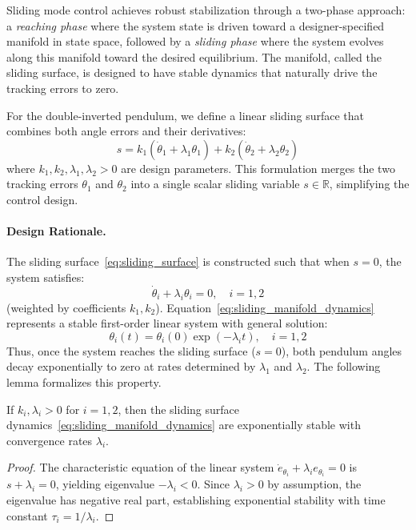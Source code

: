Sliding mode control achieves robust stabilization through a two-phase approach: a \textit{reaching phase} where the system state is driven toward a designer-specified manifold in state space, followed by a \textit{sliding phase} where the system evolves along this manifold toward the desired equilibrium. The manifold, called the sliding surface, is designed to have stable dynamics that naturally drive the tracking errors to zero.

For the double-inverted pendulum, we define a linear sliding surface that combines both angle errors and their derivatives:
\begin{equation}
\label{eq:sliding_surface}
s = k_1(\dot{\theta}_1 + \lambda_1\theta_1) + k_2(\dot{\theta}_2 + \lambda_2\theta_2)
\end{equation}
where $k_1, k_2, \lambda_1, \lambda_2 > 0$ are design parameters. This formulation merges the two tracking errors $\theta_1$ and $\theta_2$ into a single scalar sliding variable $s \in \mathbb{R}$, simplifying the control design.

\paragraph{Design Rationale.}
The sliding surface~\eqref{eq:sliding_surface} is constructed such that when $s = 0$, the system satisfies:
\begin{equation}
\label{eq:sliding_manifold_dynamics}
\dot{\theta}_i + \lambda_i\theta_i = 0, \quad i = 1, 2
\end{equation}
(weighted by coefficients $k_1, k_2$). Equation~\eqref{eq:sliding_manifold_dynamics} represents a stable first-order linear system with general solution:
\begin{equation}
\label{eq:sliding_manifold_solution}
\theta_i(t) = \theta_i(0) \exp(-\lambda_i t), \quad i = 1, 2
\end{equation}
Thus, once the system reaches the sliding surface ($s = 0$), both pendulum angles decay exponentially to zero at rates determined by $\lambda_1$ and $\lambda_2$. The following lemma formalizes this property.

\begin{lemma}
\label{lem:sliding_manifold_stability}
If $k_i, \lambda_i > 0$ for $i = 1, 2$, then the sliding surface dynamics~\eqref{eq:sliding_manifold_dynamics} are exponentially stable with convergence rates $\lambda_i$.
\end{lemma}

\begin{proof}
The characteristic equation of the linear system $\dot{e}_{\theta_i} + \lambda_i e_{\theta_i} = 0$ is $s + \lambda_i = 0$, yielding eigenvalue $-\lambda_i < 0$. Since $\lambda_i > 0$ by assumption, the eigenvalue has negative real part, establishing exponential stability with time constant $\tau_i = 1/\lambda_i$.
\end{proof}

